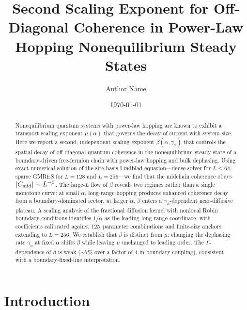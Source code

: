 \documentclass[aps,prd,twocolumn,superscriptaddress,floatfix]{revtex4-2}
\begin{document}
\title{Second Scaling Exponent for Off-Diagonal Coherence in Power-Law
Hopping Nonequilibrium Steady States}

\author{Author Name}
\date{\today}

\begin{abstract}
Nonequilibrium quantum systems with power-law hopping are known to
exhibit a transport scaling exponent $\mu(\alpha)$ that governs the
decay of current with system size. Here we report a second,
independent scaling exponent $\beta(\alpha,\gamma_\phi)$ that controls
the spatial decay of off-diagonal quantum coherence in the
nonequilibrium steady state of a boundary-driven free-fermion chain
with power-law hopping and bulk dephasing. Using exact numerical
solution of the site-basis Lindblad equation---dense solver for
$L\leq 64$, sparse GMRES for $L=128$ and $L=256$---we find that the
midchain coherence obeys $|C_{\rm mid}| \sim L^{-\beta}$. The
large-$L$ flow of $\beta$ reveals two regimes rather than a single
monotone curve: at small $\alpha$, long-range hopping produces
enhanced coherence decay from a boundary-dominated sector; at larger
$\alpha$, $\beta$ enters a $\gamma_\phi$-dependent near-diffusive
plateau. A scaling analysis of the fractional diffusion kernel with
nonlocal Robin boundary conditions identifies $1/\alpha$ as the
leading long-range coordinate, with coefficients calibrated against
125~parameter combinations and finite-size anchors extending to
$L=256$. We establish that $\beta$ is distinct from $\mu$: changing
the dephasing rate $\gamma_\phi$ at fixed $\alpha$ shifts $\beta$
while leaving $\mu$ unchanged to leading order. The $\Gamma$-dependence
of $\beta$ is weak ($\sim7\%$ over a factor of 4 in boundary
coupling), consistent with a boundary-fixed-line interpretation.
\end{abstract}

\maketitle

\section{Introduction}
\end{document}
